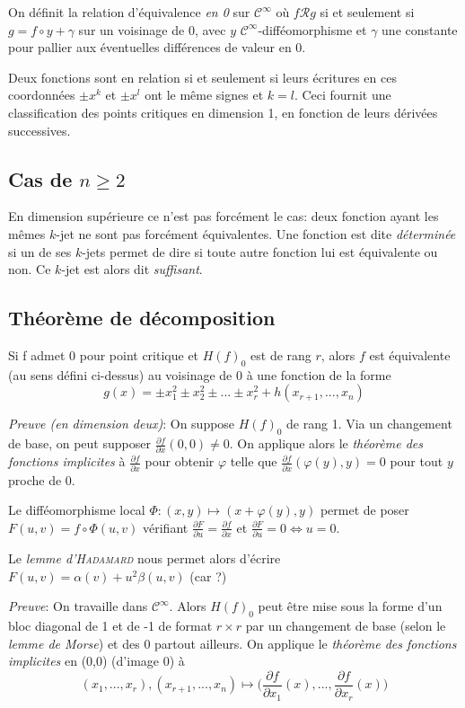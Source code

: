\documentclass{article}
\begin{document}
On définit la relation d'équivalence \textit{en 0} sur $\mathcal{C}^\infty$ où $f \mathcal{R} g$ si et seulement si $g=f\circ y + \gamma$ sur un voisinage de 0, avec $y$ $\mathcal{C}^\infty$-difféomorphisme et $\gamma$ une constante pour pallier aux éventuelles différences de valeur en 0.

Deux fonctions sont en relation si et seulement si leurs écritures en ces coordonnées $\pm x^k$ et $\pm x^l$ ont le même signes et $k=l$. Ceci fournit une classification des points critiques en dimension 1, en fonction de leurs dérivées successives.

\subsection{Cas de $n\geq 2$}

En dimension supérieure ce n'est pas forcément le cas: deux fonction ayant les mêmes $k$-jet ne sont pas forcément équivalentes. Une fonction est dite \textit{déterminée} si un de ses $k$-jets permet de dire si toute autre fonction lui est équivalente ou non. Ce $k$-jet est alors dit \textit{suffisant}.

\subsection{Théorème de décomposition}

Si f admet 0 pour point critique et $H(f)_0$ est de rang $r$, alors $f$ est équivalente (au sens défini ci-dessus) au voisinage de 0 à une fonction de la forme $$g(x)=\pm x_1^2\pm x_2^2\pm ... \pm x_r^2 + h(x_{r+1},...,x_n)$$

\textit{Preuve (en dimension deux)}: On suppose $H(f)_0$ de rang 1. Via un changement de base, on peut supposer $\frac{\partial f}{\partial x}(0,0) \neq 0$. On applique alors le \textit{théorème des fonctions implicites} à $\frac{\partial f}{\partial x}$ pour obtenir $\varphi$ telle que $\frac{\partial f}{\partial x}(\varphi(y), y)=0$ pour tout $y$ proche de 0.

Le difféomorphisme local $\Phi: (x,y) \mapsto (x+\varphi(y), y)$ permet de poser $F(u,v) = f\circ\Phi(u,v)$ vérifiant $\frac{\partial F}{\partial u}=\frac{\partial f}{\partial x}$ et $\frac{\partial F}{\partial u}=0 \iff u=0$.

Le \textit{lemme d'\textsc{Hadamard}} nous permet alors d'écrire $F(u,v)=\alpha(v)+u^2\beta(u, v)$ (car ?)

\bigskip

\textit{Preuve}: On travaille dans $\mathcal{C}^\infty$. Alors $H(f)_0$ peut être mise sous la forme d'un bloc diagonal de 1 et de -1 de format $r\times r$ par un changement de base (selon le \textit{lemme de Morse}) et des 0 partout ailleurs. On applique le \textit{théorème des fonctions implicites} en (0,0) (d'image 0) à $$(x_1,...,x_r),(x_{r+1},...,x_n)\mapsto \big(\frac{\partial f}{\partial x_1}(x), ..., \frac{\partial f}{\partial x_r}(x)\big)$$
\end{document}
